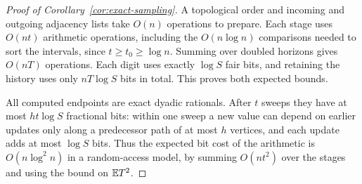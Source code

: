 \begin{proof}[Proof of Corollary~\ref{cor:exact-sampling}]
A topological order and incoming and outgoing adjacency lists take
$O(n)$ operations to prepare. Each stage uses $O(nt)$
arithmetic operations, including the $O(n\log n)$ comparisons needed
to sort the intervals, since $t\ge t_0\ge\log n$. Summing over doubled
horizons gives $O(nT)$ operations. Each digit uses exactly
$\log S$ fair bits, and retaining the history uses only $nT\log S$
bits in total. This proves both expected bounds.

All computed endpoints are exact dyadic rationals. After $t$ sweeps they
have at most $ht\log S$ fractional bits: within one sweep a new value
can depend on earlier updates only along a predecessor path of at most
$h$ vertices, and each update adds at most $\log S$ bits. Thus the
expected bit cost of the arithmetic is $O(n\log^2 n)$ in a
random-access model, by summing $O(nt^2)$ over the stages and
using the bound on $\mathbb E T^2$.
\end{proof}
